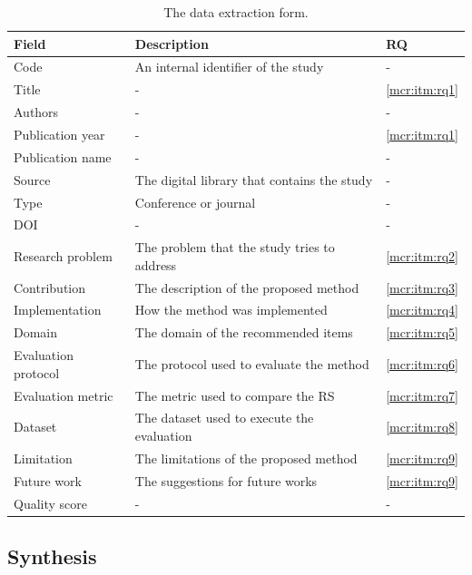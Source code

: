 \begin{table}
\centering
\begin{tabular}{@{}lll@{}}
\toprule
Field & Description & RQ  \\ \midrule
Code & An internal identifier of the study & - \\
Title & - & \ref{mcr:itm:rq1} \\
Authors & - & - \\
Publication year & - & \ref{mcr:itm:rq1} \\
Publication name & - & - \\
Source & The digital library that contains the study & - \\
Type & Conference or journal & - \\
DOI & - & - \\
Research problem & The problem that the study tries to address & \ref{mcr:itm:rq2} \\
Contribution & The description of the proposed method & \ref{mcr:itm:rq3} \\
Implementation & How the method was implemented & \ref{mcr:itm:rq4} \\
Domain & The domain of the recommended items & \ref{mcr:itm:rq5} \\
Evaluation protocol & The protocol used to evaluate the method & \ref{mcr:itm:rq6} \\
Evaluation metric & The metric used to compare the RS & \ref{mcr:itm:rq7} \\
Dataset & The dataset used to execute the evaluation & \ref{mcr:itm:rq8} \\
Limitation & The limitations of the proposed method & \ref{mcr:itm:rq9} \\
Future work & The suggestions for future works & \ref{mcr:itm:rq9} \\
Quality score & - & - \\ \bottomrule
\end{tabular}
\caption[Data extraction form]{The data extraction form.}
\label{mcr:tab:form}
\end{table}

\subsection{Synthesis}
\label{mcr:sec:synthesis}


